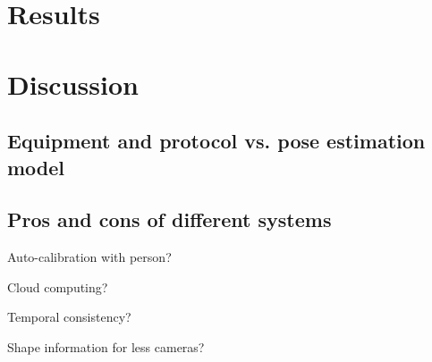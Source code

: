 \section{Results}
\blindtext


\section{Discussion}
\subsection{Equipment and protocol vs. pose estimation model}
\blindtext

\subsection{Pros and cons of different systems}

Auto-calibration with person?

Cloud computing?

Temporal consistency?

Shape information for less cameras?

\blindtext
